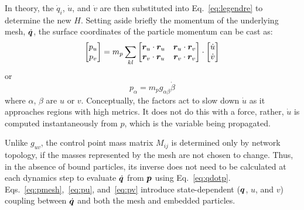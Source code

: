 In theory, the $\dot{q}_i$, $\dot{u}$, and $\dot{v}$ are then substituted into Eq.~\ref{eq:legendre} to determine the new $H$.
Setting aside briefly the momentum of the underlying mesh, $\dot{\boldsymbol{q}}$, the surface coordinates of the particle momentum can be cast as:
\begin{align}
\begin{bmatrix}
p_{u} \\
p_{v} 
\end{bmatrix}
= m_p \sum_{kl}{
\begin{bmatrix}
\boldsymbol{r}_u \cdot \boldsymbol{r}_u  & \boldsymbol{r}_u \cdot \boldsymbol{r}_v \\
\boldsymbol{r}_v \cdot \boldsymbol{r}_u  & \boldsymbol{r}_v \cdot \boldsymbol{r}_v 
\end{bmatrix}}
\cdot
\begin{bmatrix}
\dot{u} \\
\dot{v} 
\end{bmatrix}
\label{eq:pmat}
\end{align} 
or
\begin{equation}
p_\alpha = m_p g_{\alpha\beta} \dot{\beta}
\end{equation}
where $\alpha$, $\beta$ are $u$ or $v$.
Conceptually, the factors act to slow down $\dot{u}$ as it approaches regions with high metrics.
It does not do this with a force, rather, $\dot{u}$ is computed instantaneously from $p$, which is the variable being propagated.

Unlike $g_{uv}$, the control point mass matrix $M_{ij}$ is determined only by network topology, if the masses represented by the mesh are not chosen to change. 
Thus, in the absence of bound particles, its inverse does not need to be calculated at each dynamics step to evaluate $\dot{\boldsymbol{q}}$ from $\boldsymbol{p}$ using Eq.~\ref{eq:qdotp}.
Eqs.~\ref{eq:pmesh},~\ref{eq:pu}, and~\ref{eq:pv} introduce state-dependent ($\boldsymbol{q}$, $u$, and $v$) coupling between $\dot{\boldsymbol{q}}$ and both the mesh and embedded particles.

